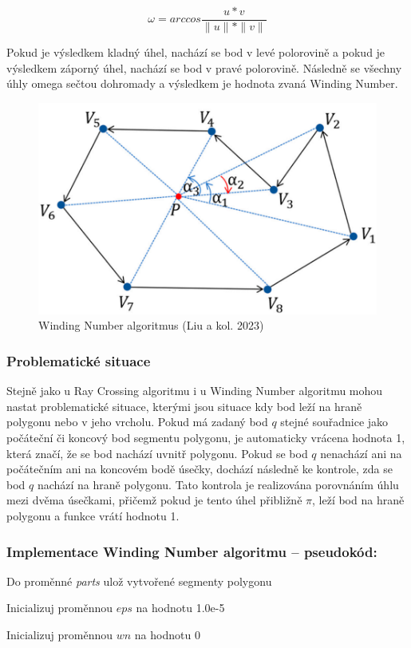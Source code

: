 \documentclass{article}
\begin{document}
\begin{spacing}{1.5}
$$\omega = arccos\frac{u*v}{\|u\|*\|v\|}$$

\vspace*{0.3cm}
Pokud je výsledkem kladný úhel, nachází se bod v levé polorovině a pokud je výsledkem záporný úhel, nachází se bod v pravé polorovině. Následně se všechny úhly omega sečtou dohromady a výsledkem je hodnota zvaná Winding Number. 
\begin{figure}[h]
    \centering
    \includegraphics[width=0.7\linewidth]{images/wind.png}
    \caption{Winding Number algoritmus (Liu a kol. 2023)}
    \label{fig:enter-label}
\end{figure}

\subsubsection{Problematické situace}
Stejně jako u Ray Crossing algoritmu i u Winding Number algoritmu mohou nastat problematické situace, kterými jsou situace kdy bod leží na hraně polygonu nebo v jeho vrcholu. Pokud má zadaný bod $q$ stejné souřadnice jako počáteční či koncový bod segmentu polygonu, je automaticky vrácena hodnota 1, která značí, že se bod nachází uvnitř polygonu. Pokud se bod $q$ nenachází ani na počátečním ani na koncovém bodě úsečky, dochází následně ke kontrole, zda se bod $q$ nachází na hraně polygonu. Tato kontrola je realizována porovnáním úhlu mezi dvěma úsečkami, přičemž pokud je tento úhel přibližně $\pi$, leží bod na hraně polygonu a funkce vrátí hodnotu 1.

\subsubsection{Implementace Winding Number algoritmu – pseudokód:}
\noindent Do proměnné \textit{parts} ulož vytvořené segmenty polygonu

\noindent Inicializuj proměnnou $eps$ na hodnotu 1.0e-5

\noindent Inicializuj proměnnou $wn$ na hodnotu 0


\end{spacing}
\end{document}

